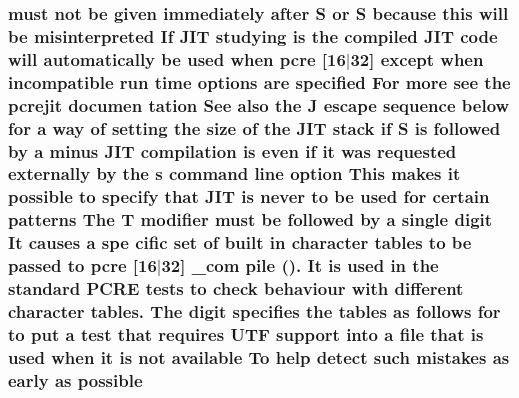 \subsubsection[{\texorpdfstring{possible}{possible}}]{ must {\bf not} {\bf be} {\bf given} immediately {\bf after} {\bf S} {\bf or} {\bf S} because {\bf this} will {\bf be} misinterpreted If J\+IT {\bf studying} {\bf is} the {\bf compiled} J\+IT {\bf code} will automatically {\bf be} {\bf used} when {\bf pcre} \mbox{[}16$\vert$32\mbox{]} {\bf except} when incompatible {\bf run} {\bf time} {\bf options} {\bf are} {\bf specified} For more see the pcrejit documen tation See also the {\bf J} escape {\bf sequence} {\bf below} for {\bf a} {\bf way} {\bf of} {\bf setting} the {\bf size} {\bf of} the J\+IT {\bf stack} {\bf if} {\bf S} {\bf is} followed by {\bf a} minus J\+IT {\bf compilation} {\bf is} even {\bf if} {\bf it} was requested externally by the {\bf s} {\bf command} {\bf line} {\bf option} This makes {\bf it} possible {\bf to} specify that J\+IT {\bf is} never {\bf to} {\bf be} {\bf used} for certain {\bf patterns} The {\bf T} {\bf modifier} must {\bf be} followed by {\bf a} single digit It causes {\bf a} spe cific {\bf set} {\bf of} {\bf built} {\bf in} {\bf character} {\bf tables} {\bf to} {\bf be} passed {\bf to} {\bf pcre} \mbox{[}16$\vert$32\mbox{]} \+\_\+com pile (). It {\bf is} {\bf used} {\bf in} the standard {\bf P\+C\+RE} {\bf tests} {\bf to} check behaviour {\bf with} different {\bf character} tables. The digit specifies the {\bf tables} {\bf as} {\bf follows} for {\bf to} put {\bf a} test that requires U\+TF {\bf support} into {\bf a} {\bf file} that {\bf is} {\bf used} when {\bf it} {\bf is} {\bf not} {\bf available} To help detect such mistakes {\bf as} early {\bf as} possible}\hypertarget{pcretest_8txt_a23198464f7594670aa87529673e8496f}{}\label{pcretest_8txt_a23198464f7594670aa87529673e8496f}
